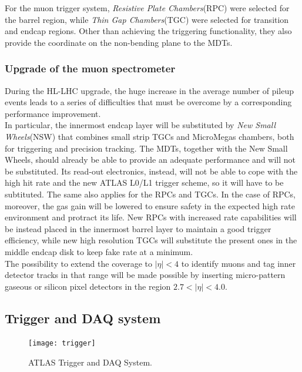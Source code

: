 \documentclass[a4paper,twoside,12pt]{article}
\begin{document}
For the muon trigger system, \textit{Resistive Plate Chambers}(RPC) were selected for the barrel region, while \textit{Thin Gap Chambers}(TGC) were selected for transition and endcap regions. Other
than achieving the triggering functionality, they also provide the coordinate on the non-bending plane to the MDTs. 

\subsubsection*{Upgrade of the muon spectrometer}\cite{scoping}
During the HL-LHC upgrade, the huge increase in the average number of pileup events leads to a series of difficulties that must be overcome by a corresponding performance improvement.\\

In particular, the innermost endcap layer will be substituted by \textit{New Small Wheels}(NSW) that combines small strip TGCs and MicroMegas chambers, both for triggering and 
precision tracking. The MDTs, together with the New Small Wheels, should already be able to provide an adequate performance and will not be substituted. Its read-out electronics, instead, will not 
be able to cope with the high hit rate and the new ATLAS L0/L1 trigger scheme, so it will have to be subtituted. The same also applies for the RPCs and TGCs. In the case of RPCs, moreover,
the gas gain will be lowered to ensure safety in the expected high rate environment and protract its life. New RPCs with increased rate capabilities will be instead placed in the innermost barrel layer to maintain a
good trigger efficiency, while new high resolution TGCs will substitute the present ones in the middle endcap disk to keep fake rate at a minimum.\\

The possibility to extend the coverage to $|\eta| < 4$ to identify muons and tag inner detector tracks in that range will be made possible by inserting micro-pattern gaseous or silicon pixel
detectors in the region $2.7 < |\eta| < 4.0$.

\subsection{Trigger and DAQ system}

\begin{figure} [h]
	\centering
	\texttt{[image: trigger]}
	\caption{ATLAS Trigger and DAQ System\cite{Green:2010zza}.}
	\label{fig:trigger}
\end{figure}
\end{document}
